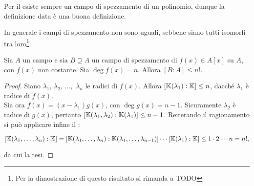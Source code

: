 \begin{remark*}
    Per il  esiste sempre un campo di spezzamento
    di un polinomio, dunque la definizione data è una buona definizione.
\end{remark*}

\begin{remark*}
    In generale i campi di spezzamento non sono uguali, sebbene siano tutti
    isomorfi tra loro\footnote{Per la dimostrazione di questo risultato
        si rimanda a TODO}.
\end{remark*}

\begin{theorem}
    Sia $A$ un campo e sia $B \supseteq A$ un campo di spezzamento
    di $f(x) \in A[x]$ su $A$, con $f(x)$ non costante. Sia $\deg f(x) = n$.
    Allora $[B : A] \leq n!$.
\end{theorem}

\begin{proof}
    Siano $\lambda_1$, $\lambda_2,\,\ldots,$ $\lambda_n$ le radici
    di $f(x)$. Allora $[\mathbb{K}(\lambda_1) : \mathbb{K}] \leq n$, dacché
    $\lambda_1$ è radice di $f(x)$. \\
    
    Sia ora $f(x)=(x-\lambda_1)g(x)$, con $\deg g(x) = n-1$. Sicuramente
    $\lambda_2$ è radice di $g(x)$, pertanto $[\mathbb{K}(\lambda_1, \lambda_2) : \mathbb{K}(\lambda_1)] \leq n-1$. Reiterando il ragionamento si può applicare infine il :
    
    \[ [\mathbb{K}(\lambda_1, \ldots, \lambda_n) : \mathbb{K}] = [\mathbb{K}(\lambda_1, \ldots, \lambda_n) : \mathbb{K}(\lambda_1, \ldots, \lambda_{n-1})] \cdots [\mathbb{K}(\lambda_1) : \mathbb{K}] \leq 1 \cdot 2 \cdots n = n!, \]
    
    \vskip 0.1in
    
    da cui la tesi.
\end{proof}
